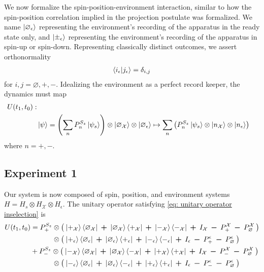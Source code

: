 We now formalize the spin-position-environment interaction, similar to how the spin-position correlation implied in the projection postulate was formalized. We name $\ket{\varnothing_\epsilon}$ representing the environment's recording of the apparatus in the ready state only, and $\ket{\pm_\epsilon}$ representing the environment's recording of the apparatus in spin-up or spin-down. Representing classically distinct outcomes, we assert orthonormality
\begin{align}
  \braket{i_\epsilon | j_\epsilon} = \delta_{i,j}
\end{align}
for $i,j = \varnothing, +, -$.
Idealizing the environment as a perfect record keeper, the dynamics must map
\begin{align} \label{eq: unitary operator inselection}
    \nonumber U(t_1, t_0): \\
    & \ket{\psi} = \left(\sum_{n} P^{S_z}_n\ket{\psi_s}\right) \otimes \ket{\varnothing_\mathcal{X}} \otimes \ket{\varnothing_\epsilon} \mapsto \sum_{n}\left(P^{S_z}_n\ket{\psi_s} \otimes \ket{n_\mathcal{X}} \otimes \ket{n_\epsilon} \right)
\end{align}
where $n= +,-$.

\subsection{Experiment 1}
Our system is now composed of spin, position, and environment systems $H = H_s \otimes H_\mathcal{X} \otimes H_\epsilon$. The unitary operator satisfying \autoref{eq: unitary operator inselection} is
\begin{align}
  U(t_1, t_0) &= P^{S_z}_+ \otimes \left(\: \ket{+_{\mathcal{X}}}\bra{\varnothing_\mathcal{X}} \: \bm{+} \: \ket{\varnothing_\mathcal{X}}\bra{+_\mathcal{X}} \: \bm{+} \: \ket{-_{\mathcal{X}}}\bra{-_\mathcal{X}} \: \bm{+} \: I_\mathcal{X} \: \bm{-} \: P^\mathcal{X}_+  \: \bm{-} \: P^\mathcal{X}_\varnothing \: \right) \\ \nonumber
  &\phantom{{}=P^{S_z}_+} \otimes \left(\: \ket{+_\epsilon}\bra{\varnothing_\epsilon} \: \bm{+} \: \ket{\varnothing_\epsilon}\bra{+_\epsilon} \: \bm{+} \: \ket{-_\epsilon}\bra{-_\epsilon} \: \bm{+} \: I_\epsilon \: \bm{-} \: P^\epsilon_+  \: \bm{-} \: P^\epsilon_\varnothing \: \right)\\ \nonumber
  &+ P^{S_z}_- \otimes \left( \: \ket{-_{\mathcal{X}}}\bra{\varnothing_\mathcal{X}} \: \bm{+} \: \ket{\varnothing_\mathcal{X}}\bra{-_\mathcal{X}} \: \bm{+} \: \ket{+_{\mathcal{X}}}\bra{+_\mathcal{X}} \: \bm{+} \: I_\mathcal{X} \: \bm{-} \: P^\mathcal{X}_-  \: \bm{-} \: P^\mathcal{X}_\varnothing \: \right) \\ \nonumber
 &\phantom{{}=P^{S_z}_-} \otimes \left(\: \ket{-_\epsilon}\bra{\varnothing_\epsilon} \: \bm{+} \: \ket{\varnothing_\epsilon}\bra{-_\epsilon} \: \bm{+} \: \ket{+_\epsilon}\bra{+_\epsilon} \: \bm{+} \: I_\epsilon \: \bm{-} \: P^\epsilon_-  \: \bm{-} \: P^\epsilon_\varnothing \: \right)
\end{align}

